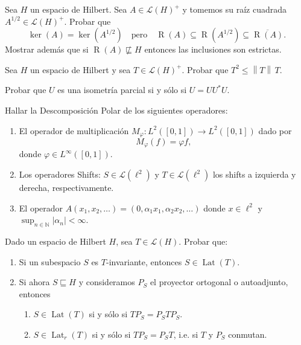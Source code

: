\documentclass{article}
\theoremstyle{definition}
\newcommand{\N}{\mathbb{N}}
\newcommand{\norm}[1]{\left\lVert #1 \right\rVert}       %
\newcommand{\cl}[1]{\overline{#1}}                       %
\newcommand{\LH}{\mathcal{L}(H)}                         %
\newcommand{\Ker}{\operatorname{ker}}                    %
\newcommand{\Ran}{\operatorname{R}}                      %
\newcommand{\Lat}{\operatorname{Lat}}                    %
\newcommand{\subesp}{\sqsubseteq}                        %
\newenvironment{ejercicio}[1]{\begin{trivlist}
\item[\hskip \labelsep {\bfseries Ejercicio}\hskip \labelsep {\bfseries #1.}]}{\end{trivlist}}
\begin{document}
\vspace{0.5cm}

\begin{ejercicio}{9}
	Sea \( H \) un espacio de Hilbert. Sea \( A \in \LH^+ \) y tomemos su raíz cuadrada \( A^{1/2} \in \LH^+ \). Probar que
	\[ \Ker(A) = \Ker(A^{1/2}) \quad \text{pero} \quad \Ran(A) \subseteq \Ran(A^{1/2}) \subseteq \cl{\Ran(A)}. \]
	Mostrar además que si \( \Ran(A) \not\subesp H \) entonces las inclusiones son estrictas.
\end{ejercicio}

\vspace{0.5cm}

\begin{ejercicio}{10}
	Sea \( H \) un espacio de Hilbert y sea \( T \in \LH^+ \). Probar que \( T^2 \le \norm{T}\, T \).
\end{ejercicio}

\vspace{0.5cm}

\begin{ejercicio}{11}
	Probar que \( U \) es una isometría parcial si y sólo si \( U = UU^*U \).
\end{ejercicio}

\vspace{0.5cm}

\begin{ejercicio}{12}
	Hallar la Descomposición Polar de los siguientes operadores:
	\begin{enumerate}
		\item El operador de multiplicación \( M_\varphi : L^2([0,1]) \to L^2([0,1]) \) dado por
		      \[ M_\varphi(f) = \varphi f, \]
		      donde \( \varphi \in L^\infty([0,1]) \).
		\item Los operadores Shifts: \( S \in \mathcal{L}(\ell^2) \) y \( T \in \mathcal{L}(\ell^2) \) los shifts a izquierda y derecha, respectivamente.
		\item El operador \( A(x_1, x_2, \ldots) = (0, \alpha_1 x_1, \alpha_2 x_2, \ldots) \) donde \( x \in \ell^2 \) y \( \sup_{n \in \N} |\alpha_n| < \infty \).
	\end{enumerate}
\end{ejercicio}

\vspace{0.5cm}

\begin{ejercicio}{13}
	Dado un espacio de Hilbert \( H \), sea \( T \in \LH \). Probar que:
	\begin{enumerate}
		\item Si un subespacio \( S \) es \( T \)-invariante, entonces \( S \in \Lat(T) \).
		\item Si ahora \( S \subesp H \) y consideramos \( P_S \) el proyector ortogonal o autoadjunto, entonces
		      \begin{enumerate}
			      \item \( S \in \Lat(T) \) si y sólo si \( TP_S = P_S T P_S \).
			      \item \( S \in \Lat_r(T) \) si y sólo si \( TP_S = P_S T \), i.e. si \( T \) y \( P_S \) conmutan.
		      \end{enumerate}
	\end{enumerate}
\end{ejercicio}
\end{document}

